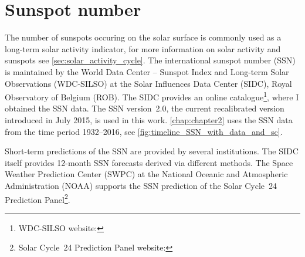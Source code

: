 

\section{Sunspot number}
\label{sec:sunspot_number}
The number of sunspots occuring on the solar surface is commonly used as a long-term solar activity indicator, for more information on solar activity and sunspots see \autoref{sec:solar_activity_cycle}. The international sunspot number (SSN) is maintained by the World Data Center -- Sunspot Index and Long-term Solar Observations (WDC-SILSO) at the Solar Influences Data Center (SIDC), Royal Observatory of Belgium (ROB). The SIDC provides an online catalogue\footnote{WDC-SILSO website: }, where I obtained the SSN data. The SSN version~2.0, the current recalibrated version introduced in July 2015, is used in this work. \autoref{chap:chapter2} uses the SSN data from the time period 1932--2016, see \autoref{fig:timeline_SSN_with_data_and_sc}.

Short-term predictions of the SSN are provided by several institutions. The SIDC itself provides 12-month SSN forecasts derived via different methods. The Space Weather Prediction Center (SWPC) at the National Oceanic and Atmospheric Administration (NOAA) supports the SSN prediction of the Solar Cycle~24 Prediction Panel\footnote{Solar Cycle~24 Prediction Panel website: }.


